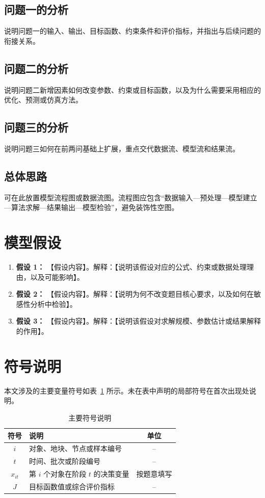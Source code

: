 \documentclass[withoutpreface,bwprint]{cumcmthesis}
\begin{document}
\subsection{问题一的分析}
说明问题一的输入、输出、目标函数、约束条件和评价指标，并指出与后续问题的衔接关系。

\subsection{问题二的分析}
说明问题二新增因素如何改变参数、约束或目标函数，以及为什么需要采用相应的优化、预测或仿真方法。

\subsection{问题三的分析}
说明问题三如何在前两问基础上扩展，重点交代数据流、模型流和结果流。

\subsection{总体思路}
可在此放置模型流程图或数据流图。流程图应包含“数据输入—预处理—模型建立—算法求解—结果输出—模型检验”，避免装饰性空图。

\section{模型假设}
\begin{enumerate}
  \item \textbf{假设 1：} 【假设内容】。解释：【说明该假设对应的公式、约束或数据处理理由，以及可能影响】。
  \item \textbf{假设 2：} 【假设内容】。解释：【说明为何不改变题目核心要求，以及如何在敏感性分析中检验】。
  \item \textbf{假设 3：} 【假设内容】。解释：【说明该假设对求解规模、参数估计或结果解释的作用】。
\end{enumerate}

\section{符号说明}
本文涉及的主要变量符号如表~\ref{tab:symbols} 所示。未在表中声明的局部符号在首次出现处说明。
\begin{table}[H]
  \centering
  \caption{主要符号说明}
  \label{tab:symbols}
  \begin{tabularx}{\textwidth}{cXc}
    \toprule
    符号 & 说明 & 单位 \\
    \midrule
    $i$ & 对象、地块、节点或样本编号 & -- \\
    $t$ & 时间、批次或阶段编号 & -- \\
    $x_{it}$ & 第 $i$ 个对象在阶段 $t$ 的决策变量 & 按题意填写 \\
    $J$ & 目标函数值或综合评价指标 & -- \\
    \bottomrule
  \end{tabularx}
\end{table}
\end{document}
